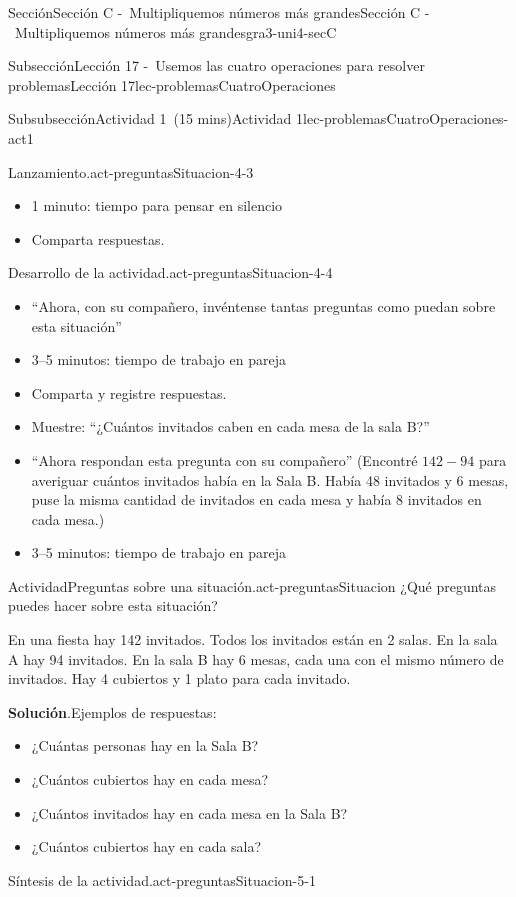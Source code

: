 \documentclass[oneside,10pt,]{article}
\newcommand{\blocktitlefont}{\relax}
\begin{document}
\begin{sectionptx}{Sección}{Sección C -~Multipliquemos números más grandes}{}{Sección C -~Multipliquemos números más grandes}{}{}{gra3-uni4-secC}
\begin{subsectionptx}{Subsección}{Lección 17 -~Usemos las cuatro operaciones para resolver problemas}{}{Lección 17}{}{}{lec-problemasCuatroOperaciones}
\begin{subsubsectionptx}{Subsubsección}{Actividad 1~(15 mins)}{}{Actividad 1}{}{}{lec-problemasCuatroOperaciones-act1}
\begin{paragraphs}{Lanzamiento.}{act-preguntasSituacion-4-3}
\begin{itemize}[label=\textbullet]
\item{}1 minuto: tiempo para pensar en silencio%
\item{}Comparta respuestas.%
\end{itemize}
\end{paragraphs}%
\begin{paragraphs}{Desarrollo de la actividad.}{act-preguntasSituacion-4-4}%
%
\begin{itemize}[label=\textbullet]
\item{}``Ahora, con su compañero, invéntense tantas preguntas como puedan sobre esta situación''%
\item{}3–5 minutos: tiempo de trabajo en pareja%
\item{}Comparta y registre respuestas.%
\item{}Muestre: ``¿Cuántos invitados caben en cada mesa de la sala B?''%
\item{}``Ahora respondan esta pregunta con su compañero'' (Encontré \(142 - 94\) para averiguar cuántos invitados había en la Sala B. Había 48 invitados y 6 mesas, puse la misma cantidad de invitados en cada mesa y había 8 invitados en cada mesa.)%
\item{}3–5 minutos: tiempo de trabajo en pareja%
\end{itemize}
\end{paragraphs}%
\begin{activity}{Actividad}{Preguntas sobre una situación.}{act-preguntasSituacion}%
¿Qué preguntas puedes hacer sobre esta situación?%
\par
En una fiesta hay 142 invitados. Todos los invitados están en 2 salas. En la sala A hay 94 invitados. En la sala B hay 6 mesas, cada una con el mismo número de invitados. Hay 4 cubiertos y 1 plato para cada invitado.%
\par\smallskip%
\noindent\textbf{\blocktitlefont Solución}.\hypertarget{act-preguntasSituacion-3}{}\quad{}Ejemplos de respuestas:%
%
\begin{itemize}[label=\textbullet]
\item{}¿Cuántas personas hay en la Sala B?%
\item{}¿Cuántos cubiertos hay en cada mesa?%
\item{}¿Cuántos invitados hay en cada mesa en la Sala B?%
\item{}¿Cuántos cubiertos hay en cada sala?%
\end{itemize}
\end{activity}%
\par
\begin{paragraphs}{Síntesis de la actividad.}{act-preguntasSituacion-5-1}%

\end{paragraphs}
\end{subsubsectionptx}
\end{subsectionptx}
\end{sectionptx}
\end{document}
